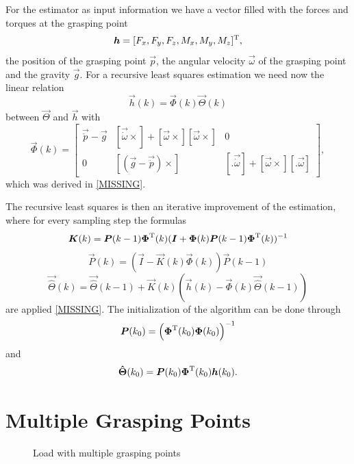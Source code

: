 For the estimator as input information we have a vector filled with the forces and torques at the grasping point
\begin{equation}
	\boldsymbol{h} = [F_x, F_y, F_z, M_x, M_y, M_z]^{\mathrm{T}},
\end{equation}
the position of the grasping point $\vec p$, the angular velocity $\vec \omega$ of the grasping point and the gravity $\vec g$. For a recursive least squares estimation we need now the linear relation
\begin{equation}
	\vec{h}(k) = \vec{\Phi}(k) \vec{\Theta}(k)
\end{equation}
between $\vec{\Theta}$ and $\vec{h}$ with
\begin{equation}
	\vec{\Phi}(k) = 
	\begin{bmatrix}
		\vec{\ddot p} - \vec{g}	& [\vec{\dot \omega} \times] + [\vec{\omega}\times] [\vec{\omega} \times]	& 0 \\
		0			& [(\vec{g} - \vec{\ddot p}) \times]									& [.  \vec{\dot \omega}] + [\vec{\omega} \times] [. \vec{\omega}]
	\end{bmatrix},
\end{equation}
which was derived in \ref{MISSING}.

The recursive least squares is then an iterative improvement of the estimation, where for every sampling step the formulas
\begin{equation}
	\boldsymbol{K}(k) = \boldsymbol{P}(k-1) \boldsymbol{\Phi}^{\mathrm{T}}(k) (\boldsymbol{I} + \boldsymbol{\Phi}(k) \boldsymbol{P}(k - 1) \boldsymbol{\Phi}^{\mathrm{T}}(k))^{-1}
\end{equation}
\begin{equation}
	\vec{P}(k) = (\vec{I} - \vec{K}(k) \vec{\Phi}(k)) \vec{P}(k - 1)
\end{equation}
\begin{equation}
	\vec{\hat \Theta}(k)=\vec{ \hat \Theta}(k - 1) + \vec{K}(k) (\vec{h}(k) - \vec{\Phi}(k) \vec{\hat \Theta}(k - 1))
\end{equation}
are applied \ref{MISSING}. The initialization of the algorithm can be done through
\begin{equation}
	\boldsymbol{P}(k_0) = \left( \boldsymbol{\Phi}^{\mathrm{T}}(k_0) \boldsymbol{\Phi}(k_0) \right)^{-1}
\end{equation}
and
\begin{equation}
	\boldsymbol{\hat \Theta} (k_0) = \boldsymbol{P}(k_0) \boldsymbol{\Phi}^{\mathrm{T}}(k_0) \boldsymbol{h}(k_0).
\end{equation}

\section{Multiple Grasping Points}
\label{sec:multiple_grasping_points}
\begin{figure}
	\centering
	
	\caption{Load with multiple grasping points}
	\label{fig:load_multiple_grasping_points}
\end{figure}

